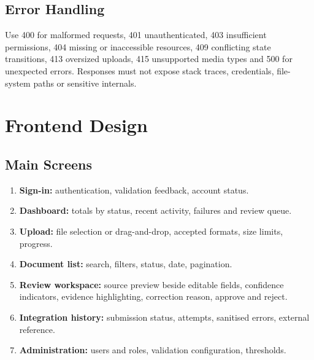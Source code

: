 \documentclass[11pt,a4paper]{report}
\begin{document}
\section{Error Handling}
Use 400 for malformed requests, 401 unauthenticated, 403 insufficient permissions, 404 missing or inaccessible resources, 409 conflicting state transitions, 413 oversized uploads, 415 unsupported media types and 500 for unexpected errors. Responses must not expose stack traces, credentials, file-system paths or sensitive internals.

\chapter{Frontend Design}
\section{Main Screens}
\begin{enumerate}
\item \textbf{Sign-in:} authentication, validation feedback, account status.
\item \textbf{Dashboard:} totals by status, recent activity, failures and review queue.
\item \textbf{Upload:} file selection or drag-and-drop, accepted formats, size limits, progress.
\item \textbf{Document list:} search, filters, status, date, pagination.
\item \textbf{Review workspace:} source preview beside editable fields, confidence indicators, evidence highlighting, correction reason, approve and reject.
\item \textbf{Integration history:} submission status, attempts, sanitised errors, external reference.
\item \textbf{Administration:} users and roles, validation configuration, thresholds.
\end{enumerate}
\end{document}
